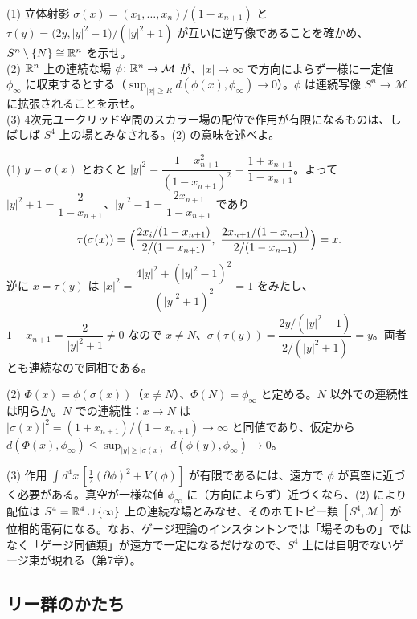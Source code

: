 \begin{problem}[難易度 B]\label{ch01-prob-stereo}
(1) 立体射影 $\sigma(x)=(x_1,\dots,x_n)/(1-x_{n+1})$ と $\tau(y)=\bigl(2y,\lvert y\rvert^2-1\bigr)/(\lvert y\rvert^2+1)$ が互いに逆写像であることを確かめ、$S^n\setminus\{N\}\cong\mathbb{R}^n$ を示せ。\\
(2) $\mathbb{R}^n$ 上の連続な場 $\phi\colon\mathbb{R}^n\to\mathcal{M}$ が、$\lvert x\rvert\to\infty$ で方向によらず一様に一定値 $\phi_\infty$ に収束するとする（$\sup_{\lvert x\rvert\ge R}d(\phi(x),\phi_\infty)\to0$）。$\phi$ は連続写像 $S^n\to\mathcal{M}$ に拡張されることを示せ。\\
(3) 4次元ユークリッド空間のスカラー場の配位で作用が有限になるものは、しばしば $S^4$ 上の場とみなされる。(2) の意味を述べよ。
\end{problem}

\begin{solution}
(1) $y=\sigma(x)$ とおくと $\lvert y\rvert^2=\dfrac{1-x_{n+1}^2}{(1-x_{n+1})^2}=\dfrac{1+x_{n+1}}{1-x_{n+1}}$。よって $\lvert y\rvert^2+1=\dfrac{2}{1-x_{n+1}}$、$\lvert y\rvert^2-1=\dfrac{2x_{n+1}}{1-x_{n+1}}$ であり
\[
\tau(\sigma(x))=\Bigl(\frac{2x_i/(1-x_{n+1})}{2/(1-x_{n+1})},\ \frac{2x_{n+1}/(1-x_{n+1})}{2/(1-x_{n+1})}\Bigr)=x .
\]
逆に $x=\tau(y)$ は $\lvert x\rvert^2=\dfrac{4\lvert y\rvert^2+(\lvert y\rvert^2-1)^2}{(\lvert y\rvert^2+1)^2}=1$ をみたし、$1-x_{n+1}=\dfrac{2}{\lvert y\rvert^2+1}\neq0$ なので $x\neq N$、$\sigma(\tau(y))=\dfrac{2y/(\lvert y\rvert^2+1)}{2/(\lvert y\rvert^2+1)}=y$。両者とも連続なので同相である。

(2) $\Phi(x)=\phi(\sigma(x))$（$x\neq N$）、$\Phi(N)=\phi_\infty$ と定める。$N$ 以外での連続性は明らか。$N$ での連続性：$x\to N$ は $\lvert\sigma(x)\rvert^2=(1+x_{n+1})/(1-x_{n+1})\to\infty$ と同値であり、仮定から $d(\Phi(x),\phi_\infty)\le\sup_{\lvert y\rvert\ge\lvert\sigma(x)\rvert}d(\phi(y),\phi_\infty)\to0$。

(3) 作用 $\int d^4x\,[\tfrac12(\partial\phi)^2+V(\phi)]$ が有限であるには、遠方で $\phi$ が真空に近づく必要がある。真空が一様な値 $\phi_\infty$ に（方向によらず）近づくなら、(2) により配位は $S^4=\mathbb{R}^4\cup\{\infty\}$ 上の連続な場とみなせ、そのホモトピー類 $[S^4,\mathcal{M}]$ が位相的電荷になる。なお、ゲージ理論のインスタントンでは「場そのもの」ではなく「ゲージ同値類」が遠方で一定になるだけなので、$S^4$ 上には自明でないゲージ束が現れる（第7章）。
\end{solution}

\subsection{リー群のかたち}

